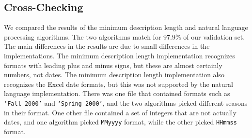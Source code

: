 \subsection{Cross-Checking}
We compared the results of the minimum description length and natural language processing algorithms. The two algorithms match for 97.9\% of our validation set. The main differences in the results are due to small differences in the implementations. The minimum description length implementation recognizes formats with leading plus and minus signs, but these are almost certainly numbers, not dates. The minimum description length implementation also recognizes the Excel date formats, but this was not supported by the natural language implementation. There was one file that contained formats such as \texttt{`Fall 2000'} and \texttt{`Spring 2000'}, and the two algorithms picked different seasons in their format. One other file contained a set of integers that are not actually dates, and one algorithm picked \texttt{MMyyyy} format, while the other picked \texttt{HHmmss} format.
